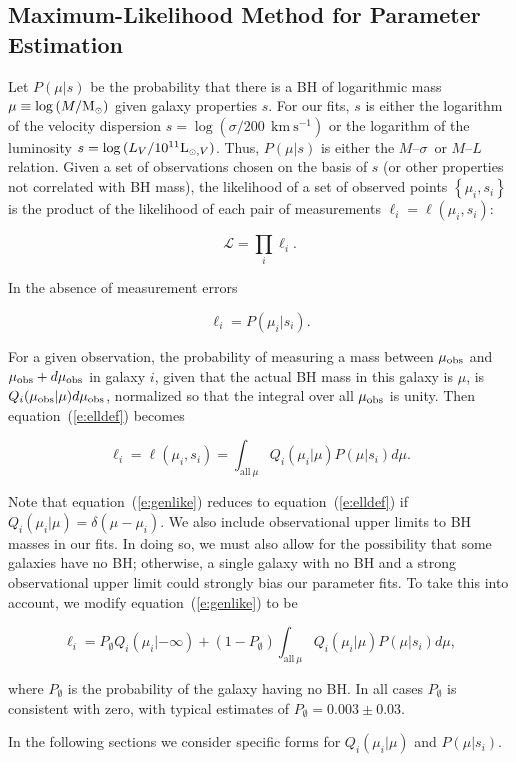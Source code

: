 \documentclass[twosided,letterpaper,numberedappendix]{emulateapj}
\newcommand{\beq}{
\begin{equation}
}
\newcommand{\eeq}{
\end{equation}
}
\newcommand{\msun}     {\ensuremath{{\rm M}_{\scriptscriptstyle \odot}}}
\newcommand{\kms}      {\ensuremath{~\mathrm{km~s^{-1}}}}
\newcommand{\msigma}   {\ensuremath{M}{--}\ensuremath{\sigma}}
\begin{document}
\subsection{Maximum-Likelihood Method for Parameter Estimation}
\label{likelihood}
Let $P\left(\mu | s\right)$ be the probability that there is a BH of
logarithmic mass $\mu \equiv \log{\left(M/\msun\right)}$ given galaxy
properties $s$.  For our fits, $s$ is either the logarithm
of the velocity dispersion $s = \log{(\sigma/200~\kms)}$ or the
logarithm of the luminosity $s = \log{(L_V / 10^{11} {\rm
L}_{{\scriptscriptstyle \odot},V})}$. Thus, $P\left(\mu | s\right)$ is
either the \msigma\ or $M$--$L$ relation.  Given a set of observations
chosen on the basis of $s$ (or other properties not correlated with BH
mass), the likelihood of a set of observed points $\left\{ \mu_{i},
s_{i} \right\}$ is the product of the likelihood of each pair of
measurements $\ell_i = \ell\left(\mu_i, s_i\right)$:
%
\beq 
{\mathcal L} = \prod_{i} \ell_{i}.
\label{e:mainlike}
\eeq 
%
In the absence of measurement errors 
\beq 
\ell_{i} = P\left(\mu_{i} | s_{i}\right).
\label{e:elldef}
\eeq
%
For a given observation, the probability of measuring a mass between
$\mu_{\rm obs}$ and $\mu_{\rm obs}+d\mu_{\rm obs}$ in galaxy $i$,
given that the actual BH mass in this galaxy is $\mu$, is
$Q_i(\mu_{\rm obs}|\mu)d\mu_{\rm obs}$, normalized so that the
integral over all $\mu_{\rm obs}$ is unity.  Then
equation~(\ref{e:elldef}) becomes
%
\beq
\ell_{i} = \ell(\mu_i, s_i)= \int_{{\mathrm{all}\ } \mu} Q_{i}\left(\mu_i | \mu\right) P\left(\mu
| s_{i}\right) d\mu.
\label{e:genlike}
\eeq 
%
Note that equation~(\ref{e:genlike}) 
reduces to equation~(\ref{e:elldef}) if $Q_{i}(\mu_i | \mu) =
\delta(\mu-\mu_{i})$.  We also include observational upper limits to
BH masses in our fits.  In doing so, we must also allow for
the possibility that some galaxies have no BH; otherwise, a
single galaxy with no BH and a strong observational upper
limit could strongly bias our parameter fits.  To take this into
account, we modify equation~(\ref{e:genlike}) to be
%
\beq
\ell_i = P_\emptyset Q_i(\mu_i|-\infty) + (1-P_\emptyset) \int_{\mathrm{all}\ \mu} Q_{i}\left(\mu_i | \mu\right) P(\mu|s_i)d\mu,
\label{e:ulgenlike}
\eeq 
%
where $P_\emptyset$ is the probability of the galaxy having no BH.  In
all cases $P_\emptyset$ is consistent with zero, with typical
estimates of $P_\emptyset = 0.003 \pm 0.03$.

In the following sections we consider specific
forms for $Q_i(\mu_i | \mu)$ and $P(\mu | s_i)$.
\end{document}
